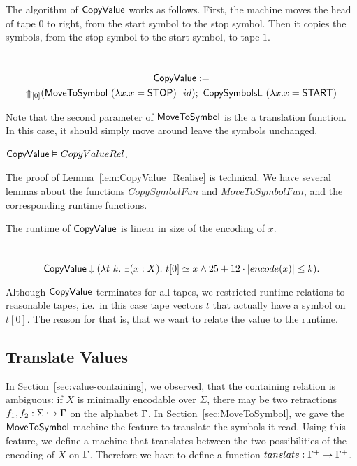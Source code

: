 The algorithm of $\MS{CopyValue}$ works as follows.  First, the machine moves the head of tape $0$ to right, from the start symbol to the stop symbol.
Then it copies the symbols, from the stop symbol to the start symbol, to tape $1$.

\begin{definition}[$\MS{CopyValue}$]
  \label{def:CopyValue}
  ~
  \begin{multline*}
    \MS{CopyValue} := \\
    \LiftTapes{(\MS{MoveToSymbol}~(\lambda x. x=\MS{STOP})~~id)}{\Vector{0}}
    \Seq
    \MS{CopySymbolsL}~(\lambda x. x=\MS{START})
  \end{multline*}
\end{definition}

Note that the second parameter of $\MS{MoveToSymbol}$ is the a translation function.  In this case, it should simply move around leave the symbols
unchanged.

\begin{lemma}
  \label{lem:CopyValue_Realise}
  $\MS{CopyValue} \Realise CopyValueRel$.
\end{lemma}

The proof of Lemma~\ref{lem:CopyValue_Realise} is technical.  We have several lemmas about the functions $CopySymbolFun$ and $MoveToSymbolFun$, and
the corresponding runtime functions.

The runtime of $\MS{CopyValue}$ is linear in size of the encoding of $x$.
\begin{lemma}
  \label{lem:CopyValue_TerminatesIn}
  ~
  \[
    \MS{CopyValue} \TerminatesIn (\lambda t~k.~\exists(x:X).~t[0] \simeq x \land 25 + 12 \cdot \size{x} \leq k).
  \]
\end{lemma}

Although $\MS{CopyValue}$ terminates for all tapes, we restricted runtime relations to reasonable tapes, i.e.\ in this case tape vectors $t$ that
actually have a symbol on $t[0]$.  The reason for that is, that we want to relate the value to the runtime.

\subsection{Translate Values}
\label{sec:Translate}

In Section~\ref{sec:value-containing}, we observed, that the containing relation is ambiguous: if $X$ is minimally encodable over $\Sigma$, there may
be two retractions $f_1, f_2 : \Sigma \hookrightarrow \Tau$ on the alphabet $\Tau$.  In Section~\ref{sec:MoveToSymbol}, we gave the
$\MS{MoveToSymbol}$ machine the feature to translate the symbols it read.  Using this feature, we define a machine that translates between the two
possibilities of the encoding of $X$ on $\Tau$.  Therefore we have to define a function $tanslate : \Tau^+ \to \Tau^+$.

